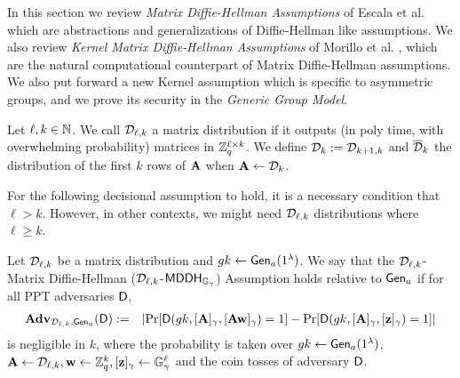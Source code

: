 In this section we review \emph{Matrix Diffie-Hellman Assumptions} of Escala et al. \cite{C:EHKRV13} which are abstractions and generalizations of Diffie-Hellman like assumptions. We also review \emph{Kernel Matrix Diffie-Hellman Assumptions} of Morillo et al. \cite{EPRINT:MorRafVil15}, which are the natural computational counterpart of Matrix Diffie-Hellman assumptions. We also put forward a new Kernel assumption which is specific to asymmetric groups, and we prove its security in the \emph{Generic Group Model}.

\begin{definition}   \label{def:matrixdef}
Let $\ell,k \in \mathbb{N}$.
We call $\mathcal{D}_{\ell,k}$ a matrix distribution if it outputs (in poly time, with overwhelming probability) matrices in $\mathbb{Z}_q^{\ell \times k}$. We define $\mathcal{D}_k := \mathcal{D}_{k+1,k}$ and $\overline{\mathcal{D}}_{k}$ the distribution of the first $k$ rows of $\mathbf{{A}}$ when $\mathbf{{A}}\gets\mathcal{D}_{k}$. 
\end{definition}

For the following decisional assumption to hold, it is a necessary condition that $\ell>k$. However, in other contexts, we might need $\mathcal{D}_{\ell,k}$ distributions where 
$\ell \geq k$. 

\begin{definition}\label{def:mdh}
Let $\mathcal{D}_{\ell,k}$ be a matrix distribution  and ${gk}\gets \mathsf{Gen}_a(1^\lambda)$. We say that the $\mathcal{D}_{\ell,k}$-Matrix Diffie-Hellman ($\mathcal{D}_{\ell,k}$-$\mathsf{MDDH}_{\mathbb{G}_\gamma}$)
Assumption holds relative to $\mathsf{Gen}_a$ if for all PPT adversaries $\mathsf{D}$,
\begin{eqnarray*}
\mathbf{Adv}_{\mathcal{D}_{\ell,k},\mathsf{Gen}_a}(\mathsf{D}) & := &
    \left|
        \Pr[\mathsf{D}({gk},[\mathbf{{A}}]_\gamma,[\mathbf{{A}}\mathbf{w}]_\gamma)=1]-
        \Pr[\mathsf{D}({gk},[\mathbf{{A}}]_\gamma, [\mathbf{z}]_\gamma) =1]
    \right|
\end{eqnarray*}
is negligible in $k$,
where the probability is taken over ${gk} \gets \mathsf{Gen}_a(1^\lambda)$, $\mathbf{{A}} \gets \mathcal{D}_{\ell,k}, \mathbf{w} \gets \mathbb{Z}_q^k, [\mathbf{z}]_\gamma  \gets \mathbb{G}_\gamma^{\ell}$ and the coin tosses of adversary $\mathsf{D}$.
\end{definition}
 
